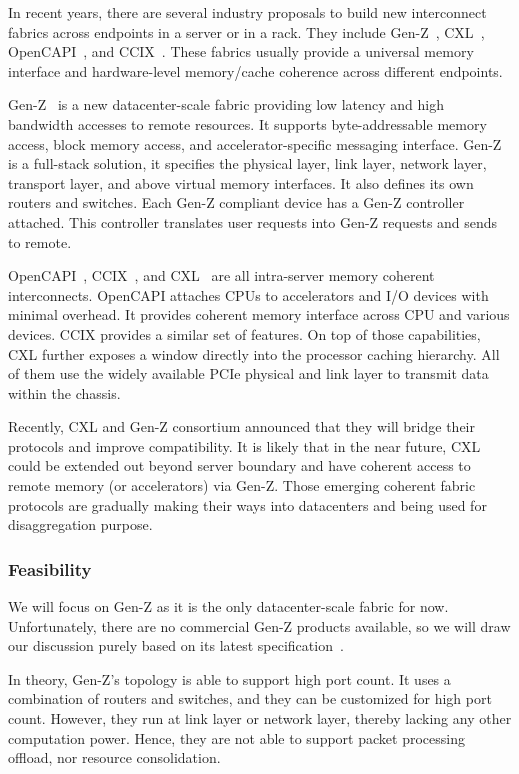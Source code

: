 In recent years, there are several industry proposals to build new interconnect
fabrics across endpoints in a server or in a rack.
They include Gen-Z~\cite{GenZ}, CXL~\cite{CXL}, OpenCAPI~\cite{OpenCAPI}, and CCIX~\cite{CCIX}.
These fabrics usually provide a universal memory interface and hardware-level memory/cache coherence across different endpoints.

Gen-Z~\cite{GenZ} is a new datacenter-scale fabric providing low latency
and high bandwidth accesses to remote resources.
It supports byte-addressable memory access, block memory access, and
accelerator-specific messaging interface.
Gen-Z is a full-stack solution, it specifies the physical layer,
link layer, network layer, transport layer, and above virtual memory interfaces.
It also defines its own routers and switches.
Each Gen-Z compliant device has a Gen-Z controller attached.
This controller translates user requests into Gen-Z requests
and sends to remote.

OpenCAPI~\cite{OpenCAPI}, CCIX~\cite{CCIX}, and CXL~\cite{CXL}
are all intra-server memory coherent interconnects.
OpenCAPI attaches CPUs to accelerators and I/O devices with minimal overhead.
It provides coherent memory interface across CPU and various devices.
CCIX provides a similar set of features.
On top of those capabilities, CXL further exposes a window directly
into the processor caching hierarchy.
All of them use the widely available PCIe physical and link layer to transmit data within the chassis.

Recently, CXL and Gen-Z consortium announced that
they will bridge their protocols and improve compatibility.
It is likely that in the near future,
CXL could be extended out beyond server boundary
and have coherent access to remote memory (or accelerators) via Gen-Z.
Those emerging coherent fabric protocols are gradually
making their ways into datacenters and being used for disaggregation purpose.

\subsubsection{Feasibility}

We will focus on Gen-Z as it is the only datacenter-scale fabric for now.
Unfortunately, there are no commercial Gen-Z products available, so we will
draw our discussion purely based on its latest specification~\cite{GenZ}.

In theory, Gen-Z's topology is able to support high port count.
It uses a combination of routers and switches, and they can be
customized for high port count.
However, they run at link layer or network layer,
thereby lacking any other computation power.
Hence, they are not able to support packet processing offload, nor resource consolidation.

